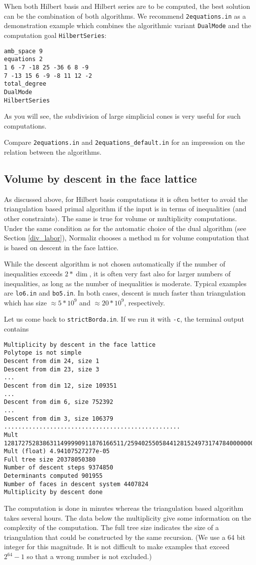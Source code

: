 \documentclass[12pt,a4paper]{scrartcl}
\theoremstyle{definition}
\begin{document}
{When both Hilbert basis and Hilbert series are to be computed, the best solution can be the combination of both algorithms. We recommend \verb|2equations.in| as a demonstration example which combines the algorithmic variant \verb|DualMode| and the computation goal \verb|HilbertSeries|:
\begin{Verbatim}
amb_space 9
equations 2
1 6 -7 -18 25 -36 6 8 -9
7 -13 15 6 -9 -8 11 12 -2
total_degree
DualMode
HilbertSeries
\end{Verbatim}
As you will see, the subdivision of large simplicial cones is very useful for such computations.

Compare \verb|2equations.in| and \verb|2equations_default.in| for an impression on the relation between the algorithms.

\subsection{Volume by descent in the face lattice}\label{descent}

As discussed above, for Hilbert basis computations it is often better to avoid the triangulation based primal algorithm if the input is in terms of inequalities (and other constraints). The same is true for volume or multiplicity computations. Under the same condition as for the automatic choice of the dual algorithm (see Section \ref{div_labor}), Normaliz chooses a method m for volume computation that is based on descent in the face lattice.

While the descent algorithm is not chosen automatically if the number of inequalities exceeds $2*\dim$, it is often very fast also for larger numbers of inequalities, as long as the number of inequalities is moderate. Typical examples are \verb|lo6.in| and \verb|bo5.in|. In both cases, descent is much faster than triangulation which has size $\approx 5*10^9$ and $\approx 20*10^9$, respectively.

Let us come back to \verb|strictBorda.in|. If we run it with \verb|-c|, the terminal output contains
\begin{Verbatim}
Multiplicity by descent in the face lattice
Polytope is not simple
Descent from dim 24, size 1
Descent from dim 23, size 3
...
Descent from dim 12, size 109351
...
Descent from dim 6, size 752392
...
Descent from dim 3, size 106379
..................................................
Mult 1281727528386311499990911876166511/25940255058441281524973174784000000000
Mult (float) 4.94107527277e-05
Full tree size 20378050380
Number of descent steps 9374850
Determinants computed 901955
Number of faces in descent system 4407824
Multiplicity by descent done
\end{Verbatim}
The computation is done in minutes whereas the triangulation based algorithm takes several hours. The data below the multiplicity give some information on the complexity of the computation. The full tree size indicates the size of a triangulation that could be constructed by the same recursion. (We use a 64 bit integer for this magnitude. It is not difficult to make examples that exceed $2^{64}-1$ so that a wrong number is not excluded.)

}
\end{document}

